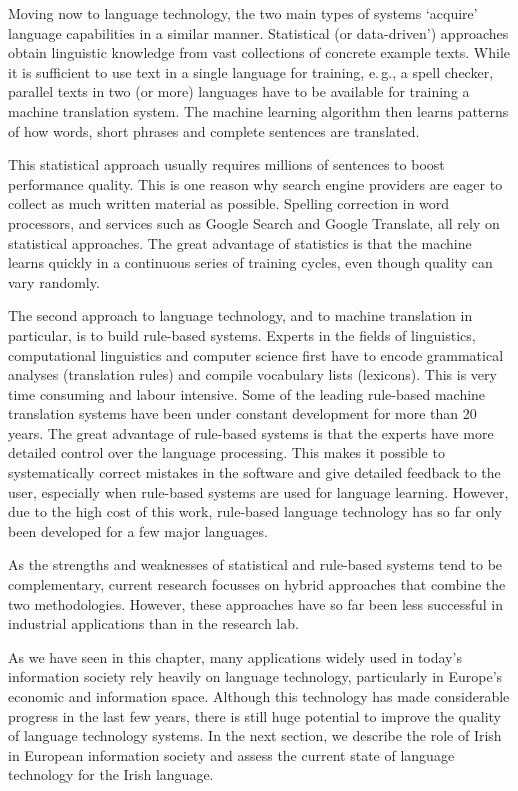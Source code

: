\documentclass[]{../../metanetpaper}
\begin{document}
\begin{multicols}{2}
Moving now to language technology, the two main types of systems `acquire' language capabilities in a similar manner. Statistical (or data-driven') approaches obtain linguistic knowledge from vast collections of concrete example texts. While it is sufficient to use text in a single language for training, e.\,g., a spell checker, parallel texts in two (or more) languages have to be available for training a machine translation system. The machine learning algorithm then learns patterns of how words, short phrases and complete sentences are translated. 

This statistical approach usually requires millions of sentences to boost performance quality. This is one reason why search engine providers are eager to collect as much written material as possible. Spelling correction in word processors, and services such as Google Search and Google Translate, all rely on statistical approaches. The great advantage of statistics is that the machine learns quickly in a continuous series of training cycles, even though quality can vary randomly.

The second approach to language technology, and to machine translation in particular, is to build rule-based systems. Experts in the fields of linguistics, computational linguistics and computer science first have to encode grammatical analyses (translation rules) and compile vocabulary lists (lexicons). This is very time consuming and labour intensive. Some of the leading rule-based machine translation systems have been under constant development for more than 20 years. The great advantage of rule-based systems is that the experts have more detailed control over the language processing. This makes it possible to systematically correct mistakes in the software and give detailed feedback to the user, especially when rule-based systems are used for language learning. However, due to the high cost of this work, rule-based language technology has so far only been developed for a few major languages. 


As the strengths and weaknesses of statistical and rule-based systems tend to be complementary, current research focusses on hybrid approaches that combine the two methodologies. However, these approaches have so far been less successful in industrial applications than in the research lab. 

As we have seen in this chapter, many applications widely used in today's information society rely heavily on language technology, particularly in Europe's economic and information space. Although this technology has made considerable progress in the last few years, there is still huge potential to improve the quality of language technology systems. In the next section, we describe the role of Irish in European information society and assess the current state of language technology for the Irish language.
\end{multicols}
\end{document}
